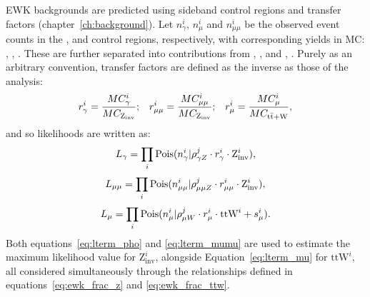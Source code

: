 EWK backgrounds are predicted using sideband control regions and transfer 
factors (chapter~\ref{ch:background}). Let $n_{\gamma}^i$, $n_{\mu}^i$ and
$n_{\mu\mu}^i$ be
the observed event counts in the \gj, \mj and \mmj control regions, 
respectively, with corresponding yields in MC: \mcp, \mcm, \mcmm. These are
further separated into contributions from \zinv, \mczinv, and ,
\mcttw. Purely as an arbitrary convention, transfer factors are defined as
the inverse as those of the analysis:
% 
\begin{equation}
r_{\gamma}^i = \frac{MC_{\gamma}^i}{MC_{\text{Z}_{\text{inv}}}};\;\;\;
r_{\mu\mu}^i = \frac{MC_{\mu\mu}^i}{MC_{\text{Z}_{\text{inv}}}};\;\;\;
r_{\mu}^i = \frac{MC_{\mu}^i}{MC_{\rm{t}\bar{\rm{t}}+\text{W}}},
\end{equation}
% 
and so likelihoods are written as:
% 
\begin{equation}
L_{\gamma} = \prod_i \text{Pois}(n_{\gamma}^i | \rho^j_{\gamma Z} \cdot r^i_{\gamma} \cdot \text{Z}^i_{\text{inv}}),
\label{eq:lterm_pho}
\end{equation}
\begin{equation}
L_{\mu\mu} = \prod_i \text{Pois}(n_{\mu\mu}^i | \rho^j_{\mu\mu Z} \cdot r^i_{\mu\mu} \cdot \text{Z}^i_{\text{inv}}),
\label{eq:lterm_mumu}
\end{equation}
\begin{equation}
L_{\mu} = \prod_i \text{Pois}(n_{\mu}^i | \rho^j_{\mu W} \cdot r^i_{\mu} \cdot \text{ttW}^i + s_{\mu}^i).
\label{eq:lterm_mu}
\end{equation}
% 
Both equations~\ref{eq:lterm_pho} and \ref{eq:lterm_mumu} are used to estimate the 
maximum likelihood value for $\text{Z}^i_{\text{inv}}$, alongside Equation~\ref{eq:lterm_mu} 
for $\text{ttW}^i$, all considered simultaneously through the relationships defined in
equations~\ref{eq:ewk_frac_z} and \ref{eq:ewk_frac_ttw}.

